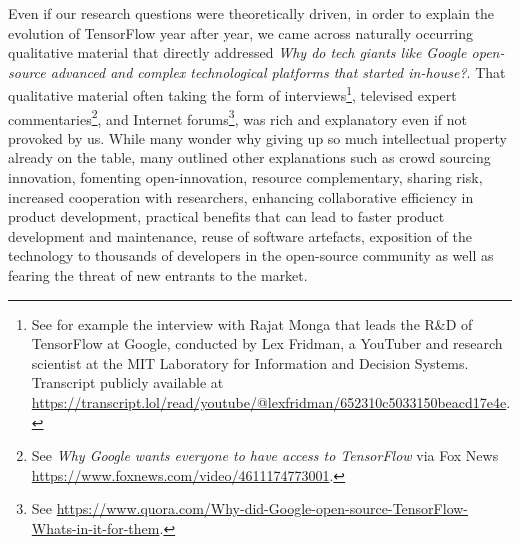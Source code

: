 \documentclass[CHICAGO,Times1COL]{WileyNJDv5} %
\begin{document}
 Even if our research questions were theoretically driven, in order to explain the evolution of 
 TensorFlow %
 year after year, we came across naturally occurring qualitative material that directly addressed \textit{Why do tech giants like Google open-source advanced and complex technological platforms that started in-house?}. That qualitative material often taking the form of
 interviews\footnote{See for example the interview with Rajat Monga  that leads the R\&D of TensorFlow at Google, conducted by Lex Fridman, a YouTuber and research scientist at the MIT Laboratory for Information and Decision Systems. Transcript publicly available at \href{https://transcript.lol/read/youtube/@lexfridman/652310c5033150beacd17e4e}{https://transcript.lol/read/youtube/@lexfridman/652310c5033150beacd17e4e}.}, televised expert commentaries\footnote{See \textit{Why Google wants everyone to have access to TensorFlow} via Fox News \href{https://www.foxnews.com/video/4611174773001}{https://www.foxnews.com/video/4611174773001}.}, and Internet forums\footnote{See \href{https://www.quora.com/Why-did-Google-open-source-TensorFlow-Whats-in-it-for-them}{https://www.quora.com/Why-did-Google-open-source-TensorFlow-Whats-in-it-for-them}.}, was rich and explanatory even if not provoked by us. While many wonder why giving up so much intellectual property already on the table, many outlined other explanations such as crowd sourcing innovation, fomenting open-innovation, resource complementary, sharing risk, increased cooperation with researchers, enhancing collaborative efficiency in product development, practical benefits that can lead to faster product development and maintenance, reuse of software artefacts, exposition of the technology to thousands of developers in the open-source community as well as fearing the threat of new entrants to the market.
\end{document}
